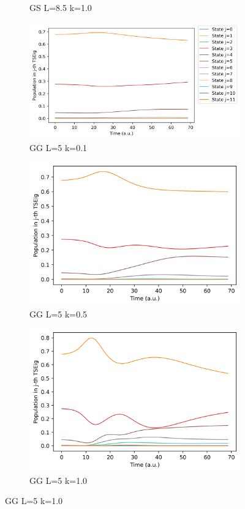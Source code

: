 \documentclass[11pt, a4paper]{article} %
\begin{document}
\begin{figure}[p]
\begin{subfigure}[b]{0.30\linewidth}
    \caption{GS L=8.5 k=1.0}
  \end{subfigure}
  \begin{subfigure}[b]{0.36\linewidth}
    \includegraphics[width=\linewidth]{Population_GG_L5_k0_0.1.png}
    \caption{GG L=5 k=0.1}
  \end{subfigure}
    \begin{subfigure}[b]{0.30\linewidth}
    \includegraphics[width=\linewidth]{Population_GG_L5_k0_0.5.png}
    \caption{GG L=5 k=0.5}
  \end{subfigure}  
  \begin{subfigure}[b]{0.30\linewidth}
    \includegraphics[width=\linewidth]{Population_GG_L5_k0_1.0.png}
    \caption{GG L=5 k=1.0}
  \end{subfigure}
  

\end{figure}
\end{document}
